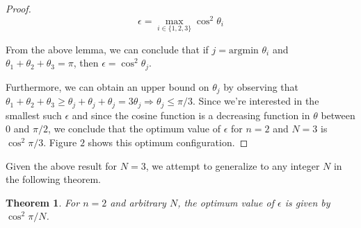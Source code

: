 \documentclass[11pt,letterpaper,twoside,english]{article}
\theoremstyle{theorem}
\newtheorem{theorem}{Theorem}[section]
\theoremstyle{remark}
\begin{document}
\begin{proof}
$$\epsilon = \max_{i \in \{1,2,3\}} \cos ^2 \theta_i$$

From the above lemma, we can conclude that if $j = \text{argmin } \theta_i$ and $\theta_1 + \theta_2 + \theta_3 = \pi$, then $\epsilon = \cos^2 \theta_j$.

Furthermore, we can obtain an upper bound on $\theta_j$ by observing that $\theta_ 1 + \theta_ 2 + \theta_3 \geq \theta_ j + \theta_j + \theta_j = 3 \theta_j \Rightarrow \theta_j \leq \pi/3$. Since we're interested in the smallest such $\epsilon$ and since the cosine function is a decreasing function in $\theta$ between $0$ and $\pi/2$, we conclude that the optimum value of $\epsilon$ for $n=2$ and $N=3$ is $\cos^2 \pi / 3$. Figure $2$ shows this optimum configuration.

\end{proof}

Given the above result for $N=3$, we attempt to generalize to any integer $N$ in the following theorem.

\begin{theorem}
For $n=2$ and arbitrary $N$, the optimum value of $\epsilon$ is given by $\cos^2 \pi/N$.
\end{theorem}
\end{document}
